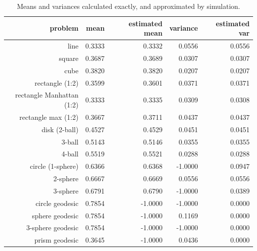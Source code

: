 \begin{table}[ht]
  \centering
  \begin{tabular}{r|rrrr}
                  problem &     mean & estimated mean & variance &  estimated var \\
     \hline 
                     line &   0.3333 &         0.3332 &   0.0556 &         0.0556 \\
                   square &   0.3687 &         0.3689 &   0.0307 &         0.0307 \\
                     cube &   0.3820 &         0.3820 &   0.0207 &         0.0207 \\
          rectangle (1:2) &   0.3599 &         0.3601 &   0.0371 &         0.0371 \\
rectangle Manhattan (1:2) &   0.3333 &         0.3335 &   0.0309 &         0.0308 \\
      rectangle max (1:2) &   0.3667 &         0.3711 &   0.0437 &         0.0437 \\
            disk (2-ball) &   0.4527 &         0.4529 &   0.0451 &         0.0451 \\
                   3-ball &   0.5143 &         0.5146 &   0.0355 &         0.0355 \\
                   4-ball &   0.5519 &         0.5521 &   0.0288 &         0.0288 \\
        circle (1-sphere) &   0.6366 &         0.6368 &  -1.0000 &         0.0947 \\
                 2-sphere &   0.6667 &         0.6669 &   0.0556 &         0.0556 \\
                 3-sphere &   0.6791 &         0.6790 &  -1.0000 &         0.0389 \\
          circle geodesic &   0.7854 &        -1.0000 &  -1.0000 &         0.0000 \\
          sphere geodesic &   0.7854 &        -1.0000 &   0.1169 &         0.0000 \\
        3-sphere geodesic &   0.7854 &        -1.0000 &  -1.0000 &         0.0000 \\
           prism geodesic &   0.3645 &        -1.0000 &   0.0436 &         0.0000 \\
  \end{tabular}
  \caption{Means and variances calculated exactly, and approximated by simulation.}
  \label{tab:mean_var_estimates}
\end{table}






